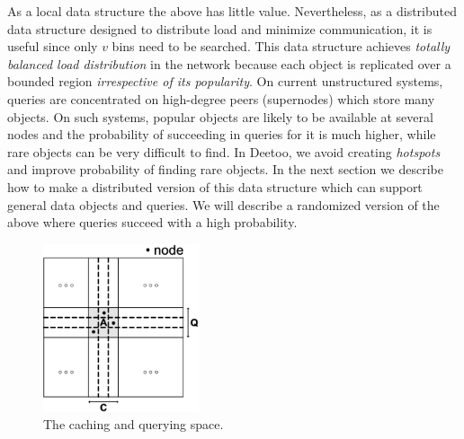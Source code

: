 \documentclass[conference]{IEEEtran}
\begin{document}
As a local data structure the above has little value.
Nevertheless, as a distributed data structure designed to distribute load and
minimize communication, it is useful since only $v$ bins need to be searched.
This data structure achieves \emph{totally balanced load distribution}
in the network because each object is replicated over a bounded region 
\emph{irrespective of its popularity}. On current unstructured systems, queries 
are concentrated on high-degree peers (supernodes) which
store many objects.  On such systems, popular objects 
are likely to be available at several nodes and the probability of succeeding in
queries for it is much higher, while rare objects can be very difficult to find.
In Deetoo, we avoid creating \emph{hotspots} and improve 
probability of finding rare objects.
In the next section we describe how to
make a distributed version of this data structure which can support general
data objects and queries.  We will describe a randomized version of the above
where queries succeed with a high probability.
\begin{figure}
\centering
\includegraphics[width=1.8in]{space}
\caption{The caching and querying space.} \label{fig:space}
\end{figure}
\label{sec:table}
\end{document}
